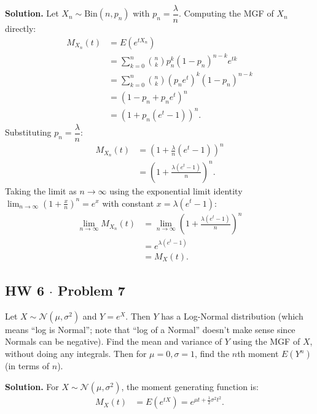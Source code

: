 \documentclass[11pt,a4paper]{article}
\begin{document}
\noindent \textbf{Solution.} Let $X_n \sim \text{Bin}(n, p_n)$ with $p_n = \dfrac{\lambda}{n}$. Computing the MGF of $X_n$ directly:
\begin{align*}
M_{X_n}(t) &= E\left( e^{tX_n} \right) \\
&= \sum_{k=0}^{n} \binom{n}{k} p_n^k (1 - p_n)^{n-k} e^{tk} \\
&= \sum_{k=0}^{n} \binom{n}{k} \left( p_n e^t \right)^k (1 - p_n)^{n-k} \\
&= \left( 1 - p_n + p_n e^t \right)^n \\
&= \left( 1 + p_n(e^t - 1) \right)^n.
\end{align*}
Substituting $p_n = \dfrac{\lambda}{n}$:
\begin{align*}
M_{X_n}(t) &= \left( 1 + \frac{\lambda}{n}(e^t - 1) \right)^n \\
&= \left( 1 + \frac{\lambda(e^t - 1)}{n} \right)^n.
\end{align*}
Taking the limit as $n \to \infty$ using the exponential limit identity $\lim_{n \to \infty} \left( 1 + \frac{x}{n} \right)^n = e^x$ with constant $x = \lambda(e^t - 1)$:
\begin{align*}
\lim_{n \to \infty} M_{X_n}(t) &= \lim_{n \to \infty} \left( 1 + \frac{\lambda(e^t - 1)}{n} \right)^n \\
&= e^{\lambda(e^t - 1)} \\
&= M_X(t).
\end{align*}

\vspace{10pt}
\subsection{HW 6 $\cdot$ Problem 7}
\begin{tcolorbox}[title={HW 6 $\cdot$ Problem 7}]
Let $X \sim \mathcal{N}(\mu, \sigma^2)$ and $Y = e^X$. Then $Y$ has a Log-Normal distribution (which means ``log is Normal''; note that ``log of a Normal'' doesn't make sense since Normals can be negative).
Find the mean and variance of $Y$ using the MGF of $X$, without doing any integrals. Then for $\mu = 0, \sigma = 1$, find the $n$th moment $E(Y^n)$ (in terms of $n$).
\end{tcolorbox}

\noindent \textbf{Solution.} For $X \sim \mathcal{N}(\mu, \sigma^2)$, the moment generating function is:
\begin{align*}
M_X(t) &= E\left( e^{tX} \right) = e^{\mu t + \frac{1}{2}\sigma^2 t^2}.
\end{align*}
\end{document}
